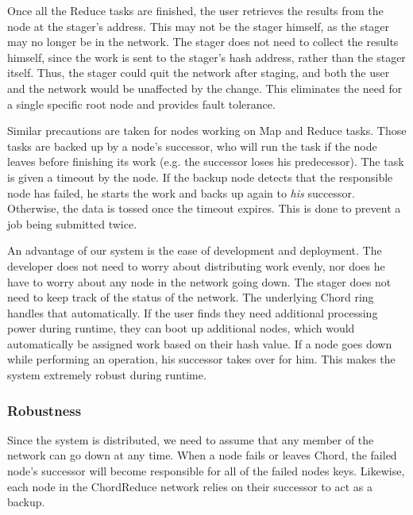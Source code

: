 Once all the Reduce tasks are finished, the user retrieves the results from the node at the stager's address.
This may not be the stager himself, as the stager may no longer be in the network.
The stager does not need to collect the results himself, since the work is sent to the stager's hash address, rather than the stager itself.
Thus, the stager could quit the network after staging, and both the user and the network would be unaffected by the change.
This eliminates the need for a single specific root node and provides fault tolerance.

Similar precautions are taken for nodes working on Map and Reduce tasks.
Those tasks are backed up by a node's successor, who will run the task if the node leaves before finishing its work (e.g. the successor loses his predecessor).
The task is given a timeout by the node.
If the backup node detects that the responsible node has failed, he starts the work and backs up again to \emph{his} successor.
Otherwise, the data is tossed once the timeout expires.
This is done to prevent a job being submitted twice.

An advantage of our system is the ease of development and deployment.
The developer does not need to worry about distributing work evenly, nor does he have to worry about any node in the network going down.
The stager does not need to keep track of the status of the network.
The underlying Chord ring handles that automatically.
If the user finds they need additional processing power during runtime, they can boot up additional nodes, which would automatically be assigned work based on their hash value.
If a node goes down while performing an operation, his successor takes over for him.
This makes the system extremely robust during runtime.


\subsubsection{Robustness}
Since the system is distributed, we need to assume that any member of the network can go down at any time.
When a node fails or leaves Chord, the failed node's successor will become responsible for all of the failed nodes keys.
Likewise, each node in the ChordReduce network relies on their successor to act as a backup.

